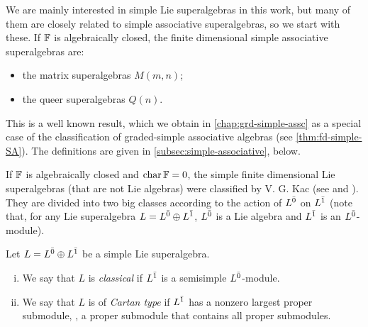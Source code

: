 

We are mainly interested in simple Lie superalgebras in this work, but many of them are closely related to simple associative superalgebras, so we start with these. 
If $\mathbb{F}$ is algebraically closed, the finite dimensional simple associative superalgebras are:
%
\begin{itemize}
    \item the matrix superalgebras $M(m,n)$;
    
    \item the queer superalgebras $Q(n)$.
\end{itemize}

This is a well known result, which we obtain in \cref{chap:grd-simple-assc} as a special case of the classification of graded-simple associative algebras (see \cref{thm:fd-simple-SA}). 
The definitions are given in \cref{subsec:simple-associative}, below. 

If $\mathbb{F}$ is algebraically closed and $\operatorname{char} \mathbb{F} = 0$, 
the simple finite dimensional Lie superalgebras (that are not Lie algebras) were classified by V. G. Kac (see \cite{artigokac} and \cite{livrosuperalgebra}). 
They are divided into two big classes according to the action of $L^{\bar0}$ on $L^{\bar1}$ (note that, for any Lie superalgebra $L=L^{\bar0} \oplus L^{\bar1}$, $L^{\bar0}$ is a Lie algebra and $L^{\bar1}$ is an $L^{\bar0}$-module). 

\begin{defi}
	Let $L=L^{\bar0} \oplus L^{\bar1}$ be a simple Lie superalgebra.
	\begin{enumerate}[(i)]
		\item We say that $L$ is \emph{classical} if $L^{\bar1}$ is a semisimple $L^{\bar0}$-module.
		\item We say that $L$ is of \emph{Cartan type} if $L^{\bar1}$ has a nonzero largest proper submodule, \ie, a proper submodule that contains all proper submodules.
	\end{enumerate}
\end{defi}

